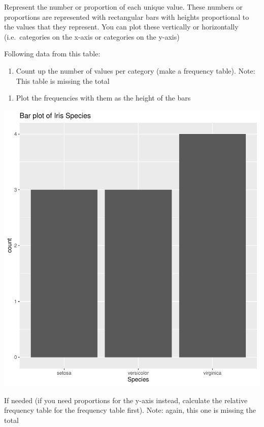 \documentclass[
]{book}
\providecommand{\tightlist}{%
  \setlength{\itemsep}{0pt}\setlength{\parskip}{0pt}}
\begin{document}
Represent the number or proportion of each unique value. These numbers
or proportions are represented with rectangular bars with heights
proportional to the values that they represent. You can plot these
vertically or horizontally (i.e.~categories on the x-axis or categories
on the y-axis)

Following data from this table:

\begin{enumerate}
\def\labelenumi{\arabic{enumi}.}
\tightlist
\item
  Count up the number of values per category (make a frequency table).
  Note: This table is missing the total
\end{enumerate}

\begin{enumerate}
\def\labelenumi{\arabic{enumi}.}
\setcounter{enumi}{1}
\tightlist
\item
  Plot the frequencies with them as the height of the bars
\end{enumerate}

\includegraphics{_main_files/figure-latex/unnamed-chunk-4-1.pdf}

If needed (if you need proportions for the y-axis instead, calculate the
relative frequency table for the frequency table first). Note: again,
this one is missing the total
\end{document}
